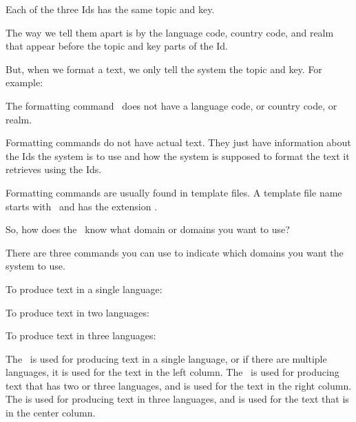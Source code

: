 \documentclass[]{memoir}
\begin{document}
Each of the three Ids has the same topic and key.

The way we tell them apart is by the language code, country code, and realm that appear before the topic and key parts of the Id.

But, when we format a text, we only tell the system the topic and key.  For example:

\begin{ltDocBlock}[]
\end{ltDocBlock}

The formatting command \ does not have a language code, or country code, or realm.

Formatting commands do not have actual text.  They just have information about the Ids the system is to use and how the system is supposed to format the text it retrieves using the Ids.

\begin{boxed}
Formatting commands are usually found in template files.  A template file name starts with \ and has the extension .
\end{boxed}

So, how does the \ltOcmcSystemAcronymn{}\ know what domain or domains you want to use?

There are three commands you can use to indicate which domains you want the system to use.

To produce text in a single language:
\begin{ltDocBlock}[]
\end{ltDocBlock}
To produce text in two languages:
\begin{ltDocBlock}[]
\end{ltDocBlock}
To produce text in three languages:
\begin{ltDocBlock}[]
\end{ltDocBlock}

The \ is used for producing text in a single language, or if there are multiple languages, it is used for the text in the left column.  The \ is used for producing text that has two or three languages, and is used for the text in the right column.  The  is used for producing text in three languages, and is used for the text that is in the center column.
 
\end{document}
